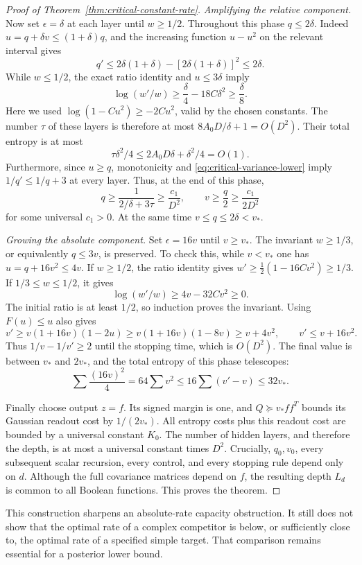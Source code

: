 \begin{proof}[Proof of Theorem~\ref{thm:critical-constant-rate}]
\emph{Amplifying the relative component.}
Now set $\epsilon=\delta$ at each layer until $w\ge1/2$.
Throughout this phase $q\le2\delta$. Indeed
$u=q+\delta v\le(1+\delta)q$, and the increasing function $u-u^2$
on the relevant interval gives
\[
 q'\le2\delta(1+\delta)-[2\delta(1+\delta)]^2\le2\delta.
\]
While $w\le1/2$, the exact ratio identity and
$u\le3\delta$ imply
\[
 \log(w'/w)
 \ge\frac\delta4-18C\delta^2\ge\frac\delta8.
\]
Here we used $\log(1-Cu^2)\ge-2Cu^2$, valid by the chosen constants.
The number $\tau$ of these layers is therefore at most
$8A_0D/\delta+1=O(D^2)$. Their total entropy is at most
\[
 \tau\delta^2/4\le2A_0D\delta+\delta^2/4=O(1).
\]
Furthermore, since $u\ge q$, monotonicity and
\eqref{eq:critical-variance-lower} imply
$1/q'\le1/q+3$ at every layer. Thus, at the end of this phase,
\[
 q\ge\frac1{2/\delta+3\tau}\ge\frac{c_1}{D^2},
 \qquad v\ge\frac q2\ge\frac{c_1}{2D^2}
\]
for some universal $c_1>0$.
At the same time $v\le q\le2\delta<v_*$.

\emph{Growing the absolute component.}
Set $\epsilon=16v$ until $v\ge v_*$.
The invariant $w\ge1/3$, or equivalently $q\le3v$, is preserved.
To check this, while $v<v_*$ one has
$u=q+16v^2\le4v$. If $w\ge1/2$, the ratio identity gives
$w'\ge\frac12(1-16Cv^2)\ge1/3$.
If $1/3\le w\le1/2$, it gives
\[
 \log(w'/w)\ge4v-32Cv^2\ge0.
\]
The initial ratio is at least $1/2$, so induction proves the invariant.
Using $F(u)\le u$ also gives
\[
 v'\ge v(1+16v)(1-2u)
       \ge v(1+16v)(1-8v)\ge v+4v^2,
 \qquad v'\le v+16v^2.
\]
Thus $1/v-1/v'\ge2$ until the stopping time, which is $O(D^2)$.
The final value is between $v_*$ and $2v_*$, and the total entropy
of this phase telescopes:
\[
 \sum\frac{(16v)^2}{4}
   =64\sum v^2\le16\sum(v'-v)\le32v_*.
\]

Finally choose output $z=f$. Its signed margin is one, and
$Q\succeq v_*ff^T$ bounds its Gaussian readout cost by $1/(2v_*)$.
All entropy costs plus this readout cost are bounded by a universal
constant $K_0$.
The number of hidden layers, and therefore the depth, is at most a
universal constant times $D^2$.
Crucially, $q_0,v_0$, every subsequent scalar recursion, every control,
and every stopping rule depend only on $d$. Although the full
covariance matrices depend on $f$, the resulting depth $L_d$ is common
to all Boolean functions. This proves the theorem.
\end{proof}

This construction sharpens an absolute-rate capacity obstruction. It
still does not show that the optimal rate of a complex competitor is
below, or sufficiently close to, the optimal rate of a specified simple
target. That comparison remains essential for a posterior lower bound.

